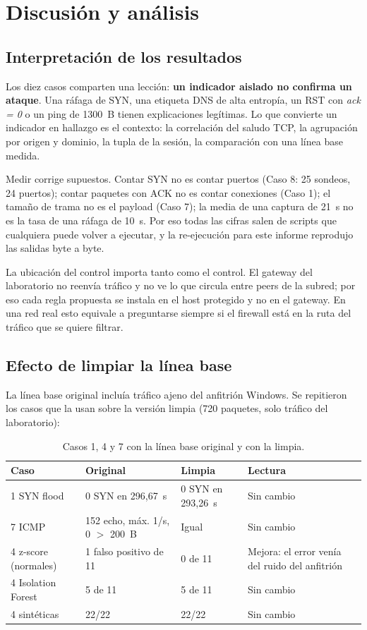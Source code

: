 \chapter{Discusión y análisis}\label{cap:discusion}

\section{Interpretación de los resultados}
Los diez casos comparten una lección: \textbf{un indicador aislado no confirma un ataque}. Una ráfaga de SYN, una etiqueta DNS de alta entropía, un RST con \emph{ack = 0} o un ping de 1300~B tienen explicaciones legítimas. Lo que convierte un indicador en hallazgo es el contexto: la correlación del saludo TCP, la agrupación por origen y dominio, la tupla de la sesión, la comparación con una línea base medida.

Medir corrige supuestos. Contar SYN no es contar puertos (Caso 8: 25 sondeos, 24 puertos); contar paquetes con ACK no es contar conexiones (Caso 1); el tamaño de trama no es el payload (Caso 7); la media de una captura de 21~s no es la tasa de una ráfaga de 10~s. Por eso todas las cifras salen de scripts que cualquiera puede volver a ejecutar, y la re-ejecución para este informe reprodujo las salidas byte a byte.

La ubicación del control importa tanto como el control. El gateway del laboratorio no reenvía tráfico y no ve lo que circula entre peers de la subred; por eso cada regla propuesta se instala en el host protegido y no en el gateway. En una red real esto equivale a preguntarse siempre si el firewall está en la ruta del tráfico que se quiere filtrar.

\section{Efecto de limpiar la línea base}
La línea base original incluía tráfico ajeno del anfitrión Windows. Se repitieron los casos que la usan sobre la versión limpia (720 paquetes, solo tráfico del laboratorio):

\begin{table}[H]\centering\small\caption{Casos 1, 4 y 7 con la línea base original y con la limpia.}
\begin{tabularx}{\linewidth}{@{}p{3.6cm}p{3.6cm}p{3.6cm}X@{}}\toprule
\textbf{Caso} & \textbf{Original} & \textbf{Limpia} & \textbf{Lectura}\\\midrule
1 SYN flood & 0 SYN en 296,67~s & 0 SYN en 293,26~s & Sin cambio\\
7 ICMP & 152 echo, máx. 1/s, 0 $>$ 200~B & Igual & Sin cambio\\
4 z-score (normales) & 1 falso positivo de 11 & 0 de 11 & Mejora: el error venía del ruido del anfitrión\\
4 Isolation Forest & 5 de 11 & 5 de 11 & Sin cambio\\
4 sintéticas & 22/22 & 22/22 & Sin cambio\\
\bottomrule\end{tabularx}\end{table}

